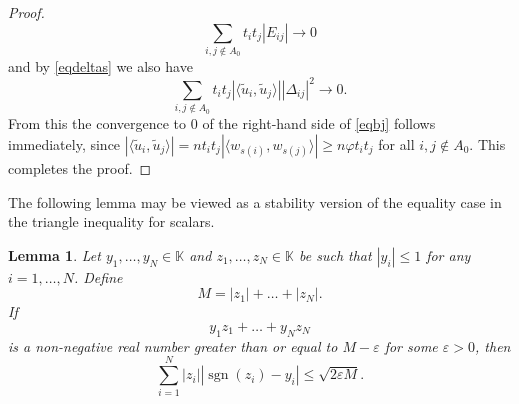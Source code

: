 \documentclass[12pt, reqno]{amsart}
\newtheorem{lem}[twr]{Lemma}
\theoremstyle{definition}
\theoremstyle{remark}
\numberwithin{equation}{section}
\DeclareMathOperator{\sgn}{sgn}
\begin{document}
\begin{proof}
\begin{equation}
\label{eqij}
\sum_{i, j \notin A_0} t_i t_j |E_{ij}| \to 0
\end{equation}
and by \eqref{eqdeltas} we also have
$$ \sum_{i,j \notin A_0} t_i t_j |\langle \widetilde{u}_i, \widetilde{u}_j \rangle| |\Delta_{ij}|^2 \to 0.$$
From this the convergence to $0$ of the right-hand side of \eqref{eqbj} follows immediately, since $|\langle \widetilde{u}_i, \widetilde{u}_j \rangle| = n t_it_j | \langle w_{s(i)}, w_{s(j)}\rangle| \geq n \varphi t_it_j$ for all $i, j \notin A_0$. This completes the proof.

\end{proof}

The following lemma may be viewed as a stability version of the equality case in the triangle inequality for scalars.

\begin{lem}
\label{stabtriangle}
Let $y_1, \ldots, y_N \in \mathbb{K}$ and $z_1, \ldots, z_N \in \mathbb{K}$ be such that $|y_i| \leq 1$ for any $i=1, \ldots, N$. Define
$$M = |z_1| + \ldots + |z_N|.$$
If 
$$y_1z_1 + \ldots + y_Nz_N$$
is a non-negative real number greater than or equal to $ M - \varepsilon$ for some $\varepsilon>0$, then 
$$\sum_{i=1}^{N} |z_i| \left |\sgn(z_i) - y_i \right | \leq \sqrt{2 \varepsilon M}.$$
\end{lem}
\end{document}
